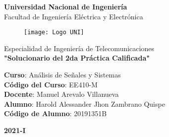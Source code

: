 \begin{titlepage}%
	\begin{center}
	 {\huge \textbf{Universidad Nacional de Ingeniería}}\\
	 \vspace{3mm}
	  {\Large {Facultad de Ingeniería Eléctrica y Electrónica}}\\
	\vspace{-5mm}	 
	 \begin{figure}[h]
	 	\centering 
	 	\texttt{[image: Logo UNI]}
	 \end{figure}
	 \vspace{-6mm}
	{\Large {Especialidad de Ingeniería de Telecomunicaciones}}\\
	\vspace{3mm}
	{\Large \textbf{"Solucionario del 2da Práctica Calificada"}}\\
	\vspace{8mm}
	\begin{flushleft}
	{\Large {\textbf{Curso}: Análisis de Señales y Sistemas}}\\
	\vspace{8mm}		
	{\Large {\textbf{Código del Curso}: EE410-M}}\\	
	\vspace{8mm}	
	{\Large {\textbf{Docente}: Manuel Arevalo Villanueva}}\\
	\vspace{8mm}	
	{\Large {\textbf{Alumno}: Harold Alessander Jhon Zambrano Quispe}}\\
	\vspace{8mm}	
	{\Large {\textbf{Código de Alumno}: 20191351B}}\\
	\end{flushleft}
	\vspace{10mm}
	{\Huge {\textbf{2021-I}}}\\
	\end{center}
\end{titlepage}
